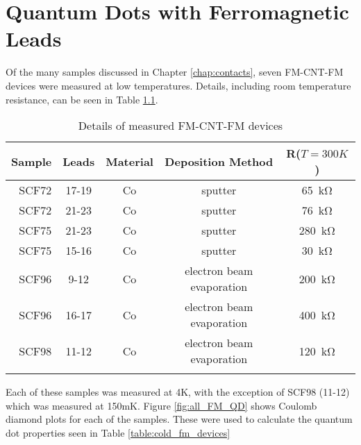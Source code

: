 \chapter{Quantum Dots with Ferromagnetic Leads}
\label{sec:FMCNTQD}

Of the many samples discussed in Chapter \ref{chap:contacts}, seven FM-CNT-FM devices were measured at low temperatures. Details, including room temperature resistance, can be seen in Table \ref{table:rt_fm_devices}.

\begin{table}
    \centering
    \begin{tabular}{ r | c | c c c}
        Sample & Leads & Material & Deposition Method & R($T=300K$) \\ \hline
        SCF72 & 17-19 & Co & sputter & \SI{65}{\kilo\ohm} \\
        SCF72 & 21-23 & Co & sputter & \SI{76}{\kilo\ohm}\\
        SCF75 & 21-23 & Co & sputter & \SI{280}{\kilo\ohm}\\
        SCF75 & 15-16 & Co & sputter & \SI{30}{\kilo\ohm}\\
        SCF96 & 9-12  & Co & electron beam evaporation & \SI{200}{\kilo\ohm}\\
        SCF96 & 16-17 & Co & electron beam evaporation & \SI{400}{\kilo\ohm}\\
        SCF98 & 11-12 & Co & electron beam evaporation & \SI{120}{\kilo\ohm}\\
        \label{table:rt_fm_devices}  
    \end{tabular}
    \caption{Details of measured FM-CNT-FM devices}
\end{table}

Each of these samples was measured at 4K, with the exception of SCF98 (11-12) which was measured at 150mK. Figure \ref{fig:all_FM_QD} shows Coulomb diamond plots for each of the samples. These were used to calculate the quantum dot properties seen in Table \ref{table:cold_fm_devices}

